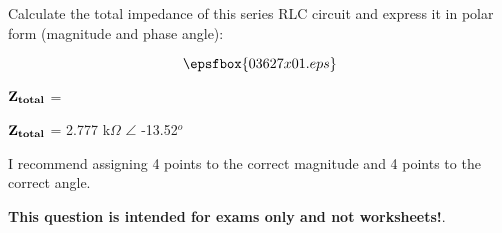 

Calculate the total impedance of this series RLC circuit and express it in polar form (magnitude and phase angle):

$$\epsfbox{03627x01.eps}$$

${\bf Z_{total}}$ = 







${\bf Z_{total}}$ = 2.777 k$\Omega$ $\angle$ -13.52$^{o}$

\vskip 10pt

I recommend assigning 4 points to the correct magnitude and 4 points to the correct angle.







{\bf This question is intended for exams only and not worksheets!}.



